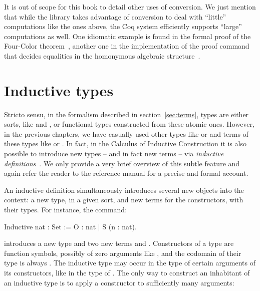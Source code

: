 It is out of scope for this book to detail other uses of
conversion. We just mention that while the \mcbMC{} library takes
advantage of conversion to deal with ``little'' computations like
the ones above, the Coq system efficiently supports ``large''
computations as well. One idiomatic example is found in the formal proof
of the Four-Color theorem~\cite{Gonthier08}, another one in
the implementation of the proof command  that decides
equalities in the
homonymous algebraic structure~\cite{gregoire:hal-00819484}.





\section{Inductive types}\label{ssec:indtypes}

Stricto sensu, in the formalism described in section~\ref{sec:terms},
types are either sorts, like  and , or functional
types constructed from these atomic ones. However, in the previous
chapters, we have casually used other types like  or 
and terms of these types like  or .
In fact, in the Calculus of Inductive Construction it is also possible
to introduce new types -- and in fact new terms -- via
\emph{inductive definitions}~\cite{CoPa89, Moh93}. We only provide a
very brief overview of this subtle feature and again refer the reader
to the reference manual for a precise and formal account.

An inductive definition simultaneously introduces
several new objects into the context: a new type, in a given sort, and
new terms for the constructors, with their types. For instance, the
command:

\begin{coq}{}{}
Inductive nat : Set := O : nat | S (n : nat).
\end{coq}
introduces a new type  and two new terms  and
. Constructors of a type  are function symbols,
possibly of zero arguments like , and the codomain of their type is
always . The inductive type  may occur in
the type of certain arguments of its constructors, like 
in the type of
. The only way to construct an inhabitant of an
inductive type is to apply a constructor to sufficiently many
arguments:

